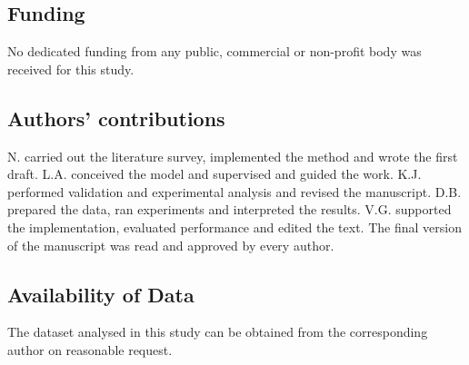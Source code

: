 \documentclass[default, iicol]{sn-jnl}
\theoremstyle{thmstyleone}%
\theoremstyle{thmstyletwo}%
\theoremstyle{thmstylethree}%
\begin{document}
\subsection{Funding}
No dedicated funding from any public, commercial or non-profit body was received for this study.

\subsection{Authors' contributions}
N. carried out the literature survey, implemented the method and wrote the first draft. L.A. conceived the model and supervised and guided the work. K.J. performed validation and experimental analysis and revised the manuscript. D.B. prepared the data, ran experiments and interpreted the results. V.G. supported the implementation, evaluated performance and edited the text. The final version of the manuscript was read and approved by every author.
\subsection{Availability of Data}
The dataset analysed in this study can be obtained from the corresponding author on reasonable request.
\end{document}

